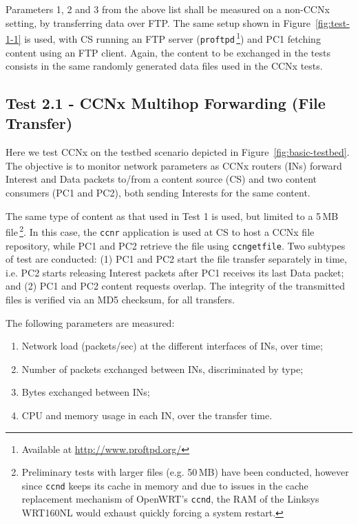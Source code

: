 Parameters 1, 2 and 3 from the above list shall be measured on a non-CCNx 
setting, by transferring data over FTP. The same setup shown 
in Figure~\ref{fig:test-1-1} is used, with CS running an FTP server 
(\verb?proftpd?\,\footnote{Available at \url{http://www.proftpd.org/}}) and PC1 
fetching content using an FTP client. Again, the content to be exchanged in the 
tests consists in the same randomly generated data files used in the CCNx tests.\vertbreak

\subsection{Test 2.1 - CCNx Multihop Forwarding (File Transfer)}
\label{subsec:test-multihop-file}

Here we test CCNx on the testbed scenario depicted in 
Figure~\ref{fig:basic-testbed}. The objective is to monitor network parameters as 
CCNx routers (INs) forward Interest and Data packets to\slash from a content source (CS) and 
two content consumers (PC1 and PC2), both sending Interests for the same 
content.\vertbreak

The same type of content as that used in Test 1 is used, but 
limited to a 5\,MB file\,\cprotect\footnote{\label{foot:note1}Preliminary tests with larger files (e.g. 50\,MB) 
have been conducted, however since \verb+ccnd+ keeps its cache in memory and 
due to issues in the cache replacement mechanism of OpenWRT's \verb+ccnd+, the 
RAM of the Linksys WRT160NL would exhaust quickly forcing a system restart.}. 
In this case, the \verb+ccnr+ application is used at CS to host a CCNx file 
repository, while PC1 and PC2 retrieve the file using \verb+ccngetfile+. Two 
subtypes of test are conducted: (1) PC1 and PC2 start the 
file transfer separately in time, i.e. PC2 starts releasing Interest packets 
after PC1 receives its last Data packet; and (2) PC1 and PC2 content 
requests overlap. The integrity of the transmitted files is verified via an 
MD5 checksum, for all transfers.\vertbreak

The following parameters are measured:

\begin{enumerate}
    \item Network load (packets\slash sec) at the different interfaces of INs, over time;
    \item Number of packets exchanged between INs, discriminated by type;
    \item Bytes exchanged between INs;
    \item CPU and memory usage in each IN, over the transfer time.
\end{enumerate}

